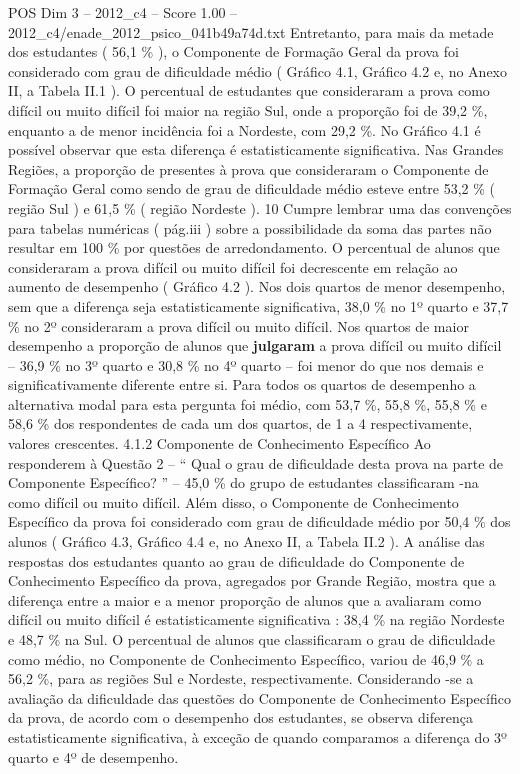 \begin{textsample}{POS Dim 3 – 2012\_c4 – Score 1.00 – 2012\_c4/enade\_2012\_psico\_041b49a74d.txt}
Entretanto, para mais da metade dos estudantes ( 56,1 \% ), o Componente de Formação Geral da prova foi considerado com grau de dificuldade médio ( Gráfico 4.1, Gráfico 4.2 e, no Anexo II, a Tabela II.1 ).
O percentual de estudantes que consideraram a prova como difícil ou muito difícil foi maior na região Sul, onde a proporção foi de 39,2 \%, enquanto a de menor incidência foi a Nordeste, com 29,2 \%.
No Gráfico 4.1 é possível observar que esta diferença é estatisticamente significativa.
Nas Grandes Regiões, a proporção de presentes à prova que consideraram o Componente de Formação Geral como sendo de grau de dificuldade médio esteve entre 53,2 \% ( região Sul ) e 61,5 \% ( região Nordeste ). 10 Cumpre lembrar uma das convenções para tabelas numéricas ( pág.iii ) sobre a possibilidade da soma das partes não resultar em 100 \% por questões de arredondamento.
O percentual de alunos que consideraram a prova difícil ou muito difícil foi decrescente em relação ao aumento de desempenho ( Gráfico 4.2 ).
Nos dois quartos de menor desempenho, sem que a diferença seja estatisticamente significativa, 38,0 \% no 1º quarto e 37,7 \% no 2º consideraram a prova difícil ou muito difícil.
Nos quartos de maior desempenho a proporção de alunos que \textbf{julgaram} a prova difícil ou muito difícil – 36,9 \% no 3º quarto e 30,8 \% no 4º quarto – foi menor do que nos demais e significativamente diferente entre si.
Para todos os quartos de desempenho a alternativa modal para esta pergunta foi médio, com 53,7 \%, 55,8 \%, 55,8 \% e 58,6 \% dos respondentes de cada um dos quartos, de 1 a 4 respectivamente, valores crescentes. 4.1.2 Componente de Conhecimento Específico Ao responderem à Questão 2 – “ Qual o grau de dificuldade desta prova na parte de Componente Específico? ” – 45,0 \% do grupo de estudantes classificaram -na como difícil ou muito difícil.
Além disso, o Componente de Conhecimento Específico da prova foi considerado com grau de dificuldade médio por 50,4 \% dos alunos ( Gráfico 4.3, Gráfico 4.4 e, no Anexo II, a Tabela II.2 ).
A análise das respostas dos estudantes quanto ao grau de dificuldade do Componente de Conhecimento Específico da prova, agregados por Grande Região, mostra que a diferença entre a maior e a menor proporção de alunos que a avaliaram como difícil ou muito difícil é estatisticamente significativa : 38,4 \% na região Nordeste e 48,7 \% na Sul.
O percentual de alunos que classificaram o grau de dificuldade como médio, no Componente de Conhecimento Específico, variou de 46,9 \% a 56,2 \%, para as regiões Sul e Nordeste, respectivamente.
Considerando -se a avaliação da dificuldade das questões do Componente de Conhecimento Específico da prova, de acordo com o desempenho dos estudantes, se observa diferença estatisticamente significativa, à exceção de quando comparamos a diferença do 3º quarto e 4º de desempenho.

\end{textsample}
